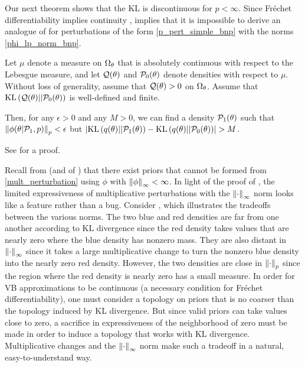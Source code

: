 Our next theorem shows that the KL is discontinuous for $p < \infty$.
Since Fr{\'e}chet differentiability implies continuity \citep[Proposition 4.8
(d)]{zeidler:2013:functional},  implies that it is
impossible to derive an analogue of  for perturbations of
the form \eqref{p_pert_simple_bnp} with the norms \eqref{phi_lp_norm_bnp}.
%
\begin{thm}
%
Let $\mu$ denote a measure on $\Omega_{\theta}$ that is absolutely continuous with
respect to the Lebesgue measure, and let $\mathcal{Q}(\theta)$ and $\mathcal{P}_{0}(\theta)$
denote densities with respect to $\mu$.  Without loss of generality, assume that
$\mathcal{Q}(\theta) > 0$ on $\Omega_{\theta}$.  Assume that $\mathrm{KL}\left(\mathcal{Q}(\theta) ||
\mathcal{P}_{0}(\theta)\right)$ is well-defined and finite.

Then, for any $\epsilon > 0$ and any $M > 0$, we can find a density
$\mathcal{P}_{1}(\theta)$ such that $\left\Vert\phi(\theta \vert \mathcal{P}_{1}, p)\right\Vert_p < \epsilon$ but
$\left|\mathrm{KL}\left(q(\theta) || \mathcal{P}_{1}(\theta)\right) - \mathrm{KL}\left(q(\theta) || \mathcal{P}_{0}(\theta)\right)\right| > M$.
%
\end{thm}
%
See  for a proof.

Recall from  (and  of
) that there exist priors that cannot be formed
from \eqref{mult_perturbation} using $\phi$ with $\left\Vert\phi\right\Vert_{\infty} < \infty$. In
light of the proof of , the limited expressiveness
of multiplicative perturbations with the $\left\Vert\cdot\right\Vert_{\infty}$ norm looks like a
feature rather than a bug.
Consider , which illustrates the tradeoffs between the
various norms.  The two blue and red densities are far from one another
according to KL divergence since the red density takes values that are nearly
zero where the blue density has nonzero mass. They are also distant in
$\left\Vert\cdot\right\Vert_{\infty}$ since it takes a large multiplicative change to turn the
nonzero blue density into the nearly zero red density. However, the two
densities are close in $\left\Vert\cdot\right\Vert_{p}$ since the region where the red density
is nearly zero has a small measure. In order for VB approximations to be
continuous (a necessary condition for Fr{\'e}chet differentiability), one must
consider a topology on priors that is no coarser than the topology induced by KL
divergence.  But since valid priors can take values close to zero, a sacrifice
in expressiveness of the neighborhood of zero must be made in order to induce a
topology that works with KL divergence. Multiplicative changes and the
$\left\Vert\cdot\right\Vert_{\infty}$ norm make such a tradeoff in a natural, easy-to-understand
way.

